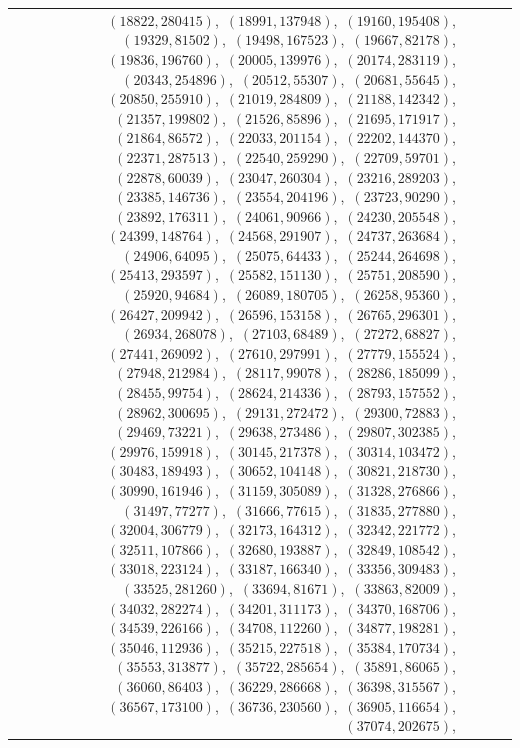 \documentclass[11pt]{article}
\begin{document}
\begin{longtable}{@{}rrl>{\raggedright\arraybackslash}p{}@{}}
$(18822,280415)$,\allowbreak\ $(18991,137948)$,\allowbreak\ $(19160,195408)$,\allowbreak\ $(19329,81502)$,\allowbreak\ $(19498,167523)$,\allowbreak\ $(19667,82178)$,\allowbreak\ $(19836,196760)$,\allowbreak\ $(20005,139976)$,\allowbreak\ $(20174,283119)$,\allowbreak\ $(20343,254896)$,\allowbreak\ $(20512,55307)$,\allowbreak\ $(20681,55645)$,\allowbreak\ $(20850,255910)$,\allowbreak\ $(21019,284809)$,\allowbreak\ $(21188,142342)$,\allowbreak\ $(21357,199802)$,\allowbreak\ $(21526,85896)$,\allowbreak\ $(21695,171917)$,\allowbreak\ $(21864,86572)$,\allowbreak\ $(22033,201154)$,\allowbreak\ $(22202,144370)$,\allowbreak\ $(22371,287513)$,\allowbreak\ $(22540,259290)$,\allowbreak\ $(22709,59701)$,\allowbreak\ $(22878,60039)$,\allowbreak\ $(23047,260304)$,\allowbreak\ $(23216,289203)$,\allowbreak\ $(23385,146736)$,\allowbreak\ $(23554,204196)$,\allowbreak\ $(23723,90290)$,\allowbreak\ $(23892,176311)$,\allowbreak\ $(24061,90966)$,\allowbreak\ $(24230,205548)$,\allowbreak\ $(24399,148764)$,\allowbreak\ $(24568,291907)$,\allowbreak\ $(24737,263684)$,\allowbreak\ $(24906,64095)$,\allowbreak\ $(25075,64433)$,\allowbreak\ $(25244,264698)$,\allowbreak\ $(25413,293597)$,\allowbreak\ $(25582,151130)$,\allowbreak\ $(25751,208590)$,\allowbreak\ $(25920,94684)$,\allowbreak\ $(26089,180705)$,\allowbreak\ $(26258,95360)$,\allowbreak\ $(26427,209942)$,\allowbreak\ $(26596,153158)$,\allowbreak\ $(26765,296301)$,\allowbreak\ $(26934,268078)$,\allowbreak\ $(27103,68489)$,\allowbreak\ $(27272,68827)$,\allowbreak\ $(27441,269092)$,\allowbreak\ $(27610,297991)$,\allowbreak\ $(27779,155524)$,\allowbreak\ $(27948,212984)$,\allowbreak\ $(28117,99078)$,\allowbreak\ $(28286,185099)$,\allowbreak\ $(28455,99754)$,\allowbreak\ $(28624,214336)$,\allowbreak\ $(28793,157552)$,\allowbreak\ $(28962,300695)$,\allowbreak\ $(29131,272472)$,\allowbreak\ $(29300,72883)$,\allowbreak\ $(29469,73221)$,\allowbreak\ $(29638,273486)$,\allowbreak\ $(29807,302385)$,\allowbreak\ $(29976,159918)$,\allowbreak\ $(30145,217378)$,\allowbreak\ $(30314,103472)$,\allowbreak\ $(30483,189493)$,\allowbreak\ $(30652,104148)$,\allowbreak\ $(30821,218730)$,\allowbreak\ $(30990,161946)$,\allowbreak\ $(31159,305089)$,\allowbreak\ $(31328,276866)$,\allowbreak\ $(31497,77277)$,\allowbreak\ $(31666,77615)$,\allowbreak\ $(31835,277880)$,\allowbreak\ $(32004,306779)$,\allowbreak\ $(32173,164312)$,\allowbreak\ $(32342,221772)$,\allowbreak\ $(32511,107866)$,\allowbreak\ $(32680,193887)$,\allowbreak\ $(32849,108542)$,\allowbreak\ $(33018,223124)$,\allowbreak\ $(33187,166340)$,\allowbreak\ $(33356,309483)$,\allowbreak\ $(33525,281260)$,\allowbreak\ $(33694,81671)$,\allowbreak\ $(33863,82009)$,\allowbreak\ $(34032,282274)$,\allowbreak\ $(34201,311173)$,\allowbreak\ $(34370,168706)$,\allowbreak\ $(34539,226166)$,\allowbreak\ $(34708,112260)$,\allowbreak\ $(34877,198281)$,\allowbreak\ $(35046,112936)$,\allowbreak\ $(35215,227518)$,\allowbreak\ $(35384,170734)$,\allowbreak\ $(35553,313877)$,\allowbreak\ $(35722,285654)$,\allowbreak\ $(35891,86065)$,\allowbreak\ $(36060,86403)$,\allowbreak\ $(36229,286668)$,\allowbreak\ $(36398,315567)$,\allowbreak\ $(36567,173100)$,\allowbreak\ $(36736,230560)$,\allowbreak\ $(36905,116654)$,\allowbreak\ $(37074,202675)$,\allowbreak\ 
\end{longtable}
\end{document}
